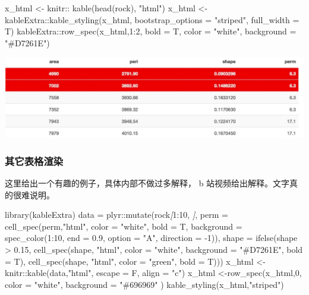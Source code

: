 \documentclass[
]{book}
\newenvironment{Shaded}{\begin{snugshade}}{\end{snugshade}}
\newcommand{\CommentTok}[1]{\textcolor[rgb]{0.56,0.35,0.01}{\textit{#1}}}
\newcommand{\NormalTok}[1]{#1}
\newcommand{\OtherTok}[1]{\textcolor[rgb]{0.56,0.35,0.01}{#1}}
\begin{document}
\begin{Shaded}
\begin{Highlighting}[]
\NormalTok{x\_html \textless{}{-} knitr:: kable(head(rock), "html")}
\NormalTok{x\_html \textless{}{-} kableExtra::kable\_styling(x\_html,}
\NormalTok{                                    bootstrap\_options = "striped",}
\NormalTok{                                    full\_width = T)}
\NormalTok{kableExtra::row\_spec(x\_html,1:2,}
\NormalTok{                        bold = T,}
\NormalTok{                        color = "white",}
\NormalTok{                        background = "\#D7261E")}
\end{Highlighting}
\end{Shaded}

\includegraphics{images/paste-1DBD1E6D.png}

\hypertarget{ux5176ux5b83ux8868ux683cux6e32ux67d3}{%
\subsubsection{其它表格渲染}\label{ux5176ux5b83ux8868ux683cux6e32ux67d3}}

这里给出一个有趣的例子，具体内部不做过多解释， b
站视频给出解释。文字真的很难说明。

\begin{Shaded}
\begin{Highlighting}[]
\NormalTok{library(kableExtra)}
\NormalTok{data =  plyr::mutate(rock}\CommentTok{[}\OtherTok{1:10, }\CommentTok{]}\NormalTok{,}
\NormalTok{                   perm = cell\_spec(perm,"html",}
\NormalTok{                   color = "white",}
\NormalTok{                   bold = T,}
\NormalTok{                   background = spec\_color(1:10,}
\NormalTok{                   end = 0.9,}
\NormalTok{                   option = "A",}
\NormalTok{                   direction = {-}1)),}
\NormalTok{  shape = ifelse(shape \textgreater{} 0.15,}
\NormalTok{                 cell\_spec(shape,}
\NormalTok{                           "html",}
\NormalTok{                           color = "white",}
\NormalTok{                           background = "\#D7261E",}
\NormalTok{                           bold = T),}
\NormalTok{                 cell\_spec(shape, "html",}
\NormalTok{                          color = "green",}
\NormalTok{                           bold = T)))}
\NormalTok{x\_html \textless{}{-}knitr::kable(data,"html", escape = F, align = "c")}
\NormalTok{x\_html \textless{}{-}row\_spec(x\_html,0, color = "white", background = "\#696969" )}
\NormalTok{kable\_styling(x\_html,"striped")}
\end{Highlighting}
\end{Shaded}
\end{document}
